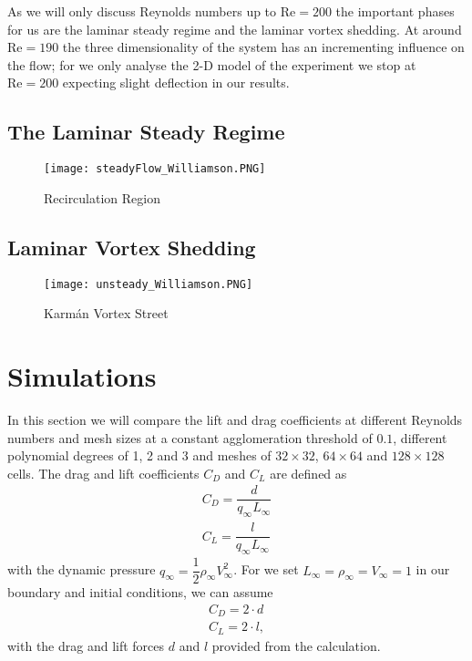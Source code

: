 	As we will only discuss Reynolds numbers up to $\text{Re} = 200$ the important phases for us are the laminar steady regime and the laminar vortex shedding. At around $\text{Re} = 190$ the three dimensionality of the system has an incrementing influence on the flow; for we only analyse the 2-D model of the experiment we stop at $\text{Re} = 200$ expecting slight deflection in our results.
	
	\subsection{The Laminar Steady Regime}
	
		\begin{figure}[htp]
			\centering
			\texttt{[image: steadyFlow\_Williamson.PNG]}
			\caption{Recirculation Region }
			\label{fig:steady}
		\end{figure}
	\subsection{Laminar Vortex Shedding}
	
		\begin{figure}[htp]
			\centering
			\texttt{[image: unsteady\_Williamson.PNG]}
			\caption{Karmán Vortex Street }
			\label{fig:unsteady}
		\end{figure}
		
\section{Simulations}
	In this section we will compare the lift and drag coefficients at different Reynolds numbers and mesh sizes at a constant agglomeration threshold of $0.1$, different polynomial degrees of 1, 2 and 3 and meshes of $32 \times 32$, $64 \times 64$ and $128 \times 128$ cells. The drag and lift coefficients $C_D$ and $C_L$ are defined as
	\begin{align}
		C_D = \dfrac{d}{q_\infty L_\infty} \\
		C_L = \dfrac{l}{q_\infty L_\infty}
	\end{align}
	with the dynamic pressure $q_\infty = \dfrac{1}{2} \rho_\infty V_\infty^2$. For we set $L_\infty = \rho_\infty = V_\infty = 1$ in our boundary and initial conditions, we can assume
	\begin{align}
		C_D = 2 \cdot d \\
		C_L = 2 \cdot l,
	\end{align}
	with the drag and lift forces $d$ and $l$ provided from the calculation.
	
